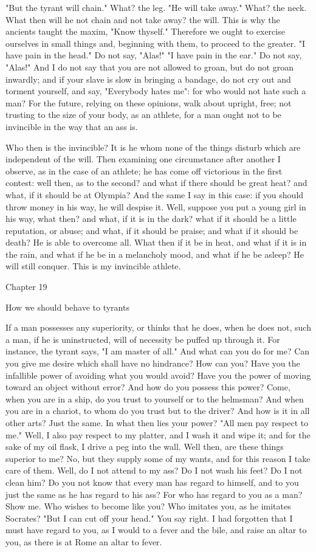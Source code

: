 \documentclass[a4paper]{article}
\begin{document}
"But the tyrant will chain." What? the leg. "He will take away." What?
the neck. What then will he not chain and not take away? the will.
This is why the ancients taught the maxim, "Know thyself." Therefore
we ought to exercise ourselves in small things and, beginning with
them, to proceed to the greater. "I have pain in the head." Do not
say, "Alas!" "I have pain in the ear." Do not say, "Alas!" And I do
not say that you are not allowed to groan, but do not groan inwardly;
and if your slave is slow in bringing a bandage, do not cry out and
torment yourself, and say, "Everybody hates me": for who would not
hate such a man? For the future, relying on these opinions, walk about
upright, free; not trusting to the size of your body, as an athlete,
for a man ought not to be invincible in the way that an ass is.

Who then is the invincible? It is he whom none of the things disturb
which are independent of the will. Then examining one circumstance
after another I observe, as in the case of an athlete; he has come
off victorious in the first contest: well then, as to the second?
and what if there should be great heat? and what, if it should be
at Olympia? And the same I say in this case: if you should throw money
in his way, he will despise it. Well, suppose you put a young girl
in his way, what then? and what, if it is in the dark? what if it
should be a little reputation, or abuse; and what, if it should be
praise; and what if it should be death? He is able to overcome all.
What then if it be in heat, and what if it is in the rain, and what
if he be in a melancholy mood, and what if he be asleep? He will still
conquer. This is my invincible athlete. 

Chapter 19

How we should behave to tyrants 

If a man possesses any superiority, or thinks that he does, when he
does not, such a man, if he is uninstructed, will of necessity be
puffed up through it. For instance, the tyrant says, "I am master
of all." And what can you do for me? Can you give me desire which
shall have no hindrance? How can you? Have you the infallible power
of avoiding what you would avoid? Have you the power of moving toward
an object without error? And how do you possess this power? Come,
when you are in a ship, do you trust to yourself or to the helmsman?
And when you are in a chariot, to whom do you trust but to the driver?
And how is it in all other arts? Just the same. In what then lies
your power? "All men pay respect to me." Well, I also pay respect
to my platter, and I wash it and wipe it; and for the sake of my oil
flask, I drive a peg into the wall. Well then, are these things superior
to me? No, but they supply some of my wants, and for this reason I
take care of them. Well, do I not attend to my ass? Do I not wash
his feet? Do I not clean him? Do you not know that every man has regard
to himself, and to you just the same as he has regard to his ass?
For who has regard to you as a man? Show me. Who wishes to become
like you? Who imitates you, as he imitates Socrates? "But I can cut
off your head." You say right. I had forgotten that I must have regard
to you, as I would to a fever and the bile, and raise an altar to
you, as there is at Rome an altar to fever. 
\end{document}
